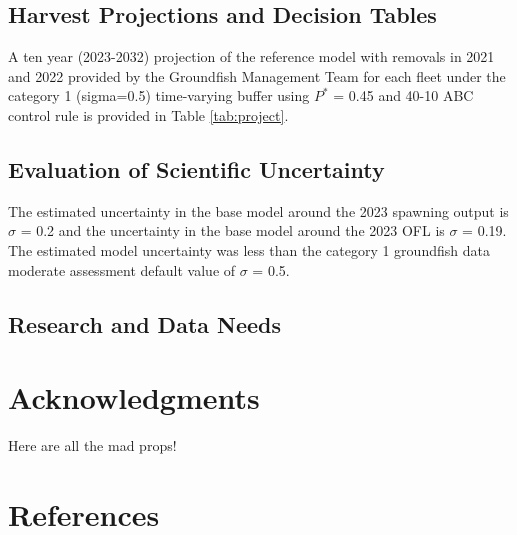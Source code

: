 \documentclass[11pt,
  english,
  letterpaper,
]{article}
\begin{document}
\hypertarget{harvest-projections-and-decision-tables}{%
\subsection{Harvest Projections and Decision Tables}\label{harvest-projections-and-decision-tables}}

A ten year (2023-2032) projection of the reference model with removals in 2021 and 2022 provided by the Groundfish Management Team for each fleet under the category 1 (sigma=0.5) time-varying buffer using \(P^*\) = 0.45 and 40-10 ABC control rule is provided in Table \ref{tab:project}.

\hypertarget{evaluation-of-scientific-uncertainty}{%
\subsection{Evaluation of Scientific Uncertainty}\label{evaluation-of-scientific-uncertainty}}

The estimated uncertainty in the base model around the 2023 spawning output is \(\sigma\) = 0.2 and the uncertainty in the base model around the 2023 OFL is \(\sigma\) = 0.19. The estimated model uncertainty was less than the category 1 groundfish data moderate assessment default value of \(\sigma\) = 0.5.

\hypertarget{research-and-data-needs-1}{%
\subsection{Research and Data Needs}\label{research-and-data-needs-1}}

\hypertarget{acknowledgments}{%
\section{Acknowledgments}\label{acknowledgments}}

Here are all the mad props!

\clearpage

\hypertarget{references}{%
\section{References}\label{references}}
\end{document}
